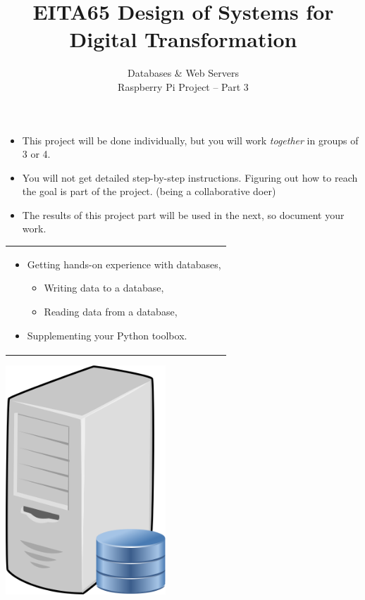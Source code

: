 \documentclass{article}
\title{EITA65 Design of Systems for Digital Transformation\\\year}
\author{\huge Databases \& Web Servers\\Raspberry Pi Project -- Part 3}
\date{}
\begin{document}
\clearpage\maketitle
\thispagestyle{empty}%

\begin{itemize}
\item This project will be done individually, but you will work \textit{together} in groups of 3 or 4.
\item You will not get detailed step-by-step instructions. Figuring out how to reach the goal is part of the project. (being a collaborative doer)
\item The results of this project part will be used in the next, so document your work.
\end{itemize}

\vspace{.1cm}
\begin{center}
\begin{tabular}{l}
\toprule[1.5pt]
\parbox{0.8\linewidth}{
\vspace{.2cm}{\Large Learning goals:}
\begin{itemize}
\item Getting hands-on experience with databases,
\begin{itemize}
\item Writing data to a database,
\item Reading data from a database,
\end{itemize}
\item Supplementing your Python toolbox.
\end{itemize}}\\
\bottomrule[1.5pt]
\end{tabular}
\end{center}

\vfill
\begin{center}
\includegraphics[width=60mm]{Database_Server.svg.png}
\end{center}
\vspace{2cm}
\end{document}
